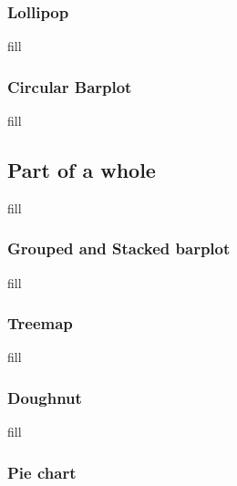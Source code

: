 \documentclass[
  b5paper]{book}
\begin{document}
\hypertarget{lollipop}{%
\subsubsection*{Lollipop}\label{lollipop}}

fill

\hypertarget{circular-barplot}{%
\subsubsection*{Circular Barplot}\label{circular-barplot}}

fill

\hypertarget{part-of-a-whole}{%
\subsection*{Part of a whole}\label{part-of-a-whole}}

fill

\hypertarget{grouped-and-stacked-barplot}{%
\subsubsection*{Grouped and Stacked barplot}\label{grouped-and-stacked-barplot}}

fill

\hypertarget{treemap}{%
\subsubsection*{Treemap}\label{treemap}}

fill

\hypertarget{doughnut}{%
\subsubsection*{Doughnut}\label{doughnut}}

fill

\hypertarget{pie-chart}{%
\subsubsection*{Pie chart}\label{pie-chart}}
\end{document}
